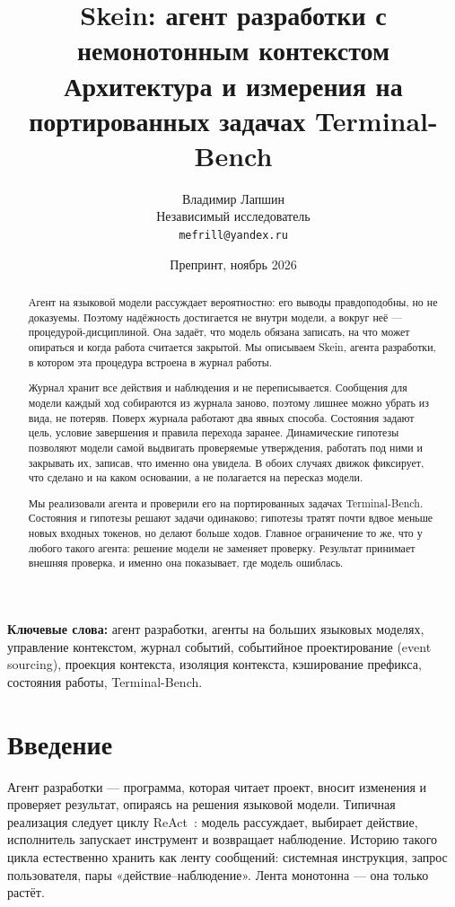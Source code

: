 \documentclass[11pt,a4paper]{article}
\title{\textbf{Skein: агент разработки с немонотонным контекстом}\\[0.4em]
\large Архитектура и измерения на портированных задачах Terminal-Bench}
\author{Владимир Лапшин\\[0.3em]
\small Независимый исследователь\\[0.2em]
\small \texttt{mefrill@yandex.ru}}
\date{Препринт, ноябрь 2026}
\begin{document}
\maketitle

\begin{abstract}
Агент на языковой модели рассуждает вероятностно: его выводы правдоподобны, но не доказуемы.
Поэтому надёжность достигается не внутри модели, а вокруг неё --- процедурой-дисциплиной. Она
задаёт, что модель обязана записать, на что может опираться и когда работа считается
закрытой. Мы описываем Skein, агента разработки, в котором эта процедура встроена в журнал
работы.

Журнал хранит все действия и наблюдения и не переписывается. Сообщения для модели каждый ход
собираются из журнала заново, поэтому лишнее можно убрать из вида, не потеряв. Поверх журнала
работают два явных способа. Состояния задают цель, условие завершения и правила перехода
заранее. Динамические гипотезы позволяют модели самой выдвигать проверяемые утверждения,
работать под ними и закрывать их, записав, что именно она увидела. В обоих случаях движок
фиксирует, что сделано и на каком основании, а не полагается на пересказ модели.

Мы реализовали агента и проверили его на портированных задачах Terminal-Bench. Состояния и
гипотезы решают задачи одинаково; гипотезы тратят почти вдвое меньше новых входных токенов,
но делают больше ходов. Главное ограничение то же, что у любого такого агента: решение модели
не заменяет проверку. Результат принимает внешняя проверка, и именно она показывает, где
модель ошиблась.
\end{abstract}

\noindent\textbf{Ключевые слова:} агент разработки, агенты на больших языковых моделях,
управление контекстом, журнал событий, событийное проектирование (event sourcing), проекция контекста, изоляция
контекста, кэширование префикса, состояния работы, Terminal-Bench.

\section{Введение}

Агент разработки --- программа, которая читает проект, вносит изменения и проверяет
результат, опираясь на решения языковой модели. Типичная реализация следует циклу
ReAct~\cite{yao2023react}: модель рассуждает, выбирает действие, исполнитель запускает
инструмент и возвращает наблюдение. Историю такого цикла естественно хранить как ленту
сообщений: системная инструкция, запрос пользователя, пары «действие--наблюдение». Лента
монотонна --- она только растёт.
\end{document}
